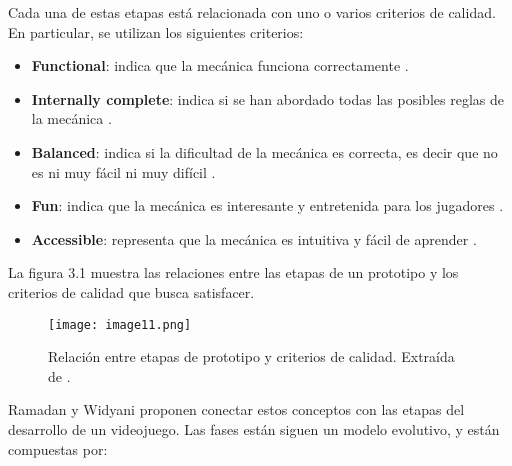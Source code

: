 \par Cada una de estas etapas está relacionada con uno o varios criterios de calidad. En particular, se utilizan los siguientes criterios:
\begin{itemize}
    \item \textbf{Functional}: indica que la mecánica funciona correctamente \cite{ramadanGameDevelopmentLife2013,fullertonGameDesignWorkshop2008}.
    \item \textbf{Internally complete}: indica si se han abordado todas las posibles reglas de la mecánica \cite{ramadanGameDevelopmentLife2013,fullertonGameDesignWorkshop2008}.
    \item \textbf{Balanced}: indica si la dificultad de la mecánica es correcta, es decir que no es ni muy fácil ni muy difícil \cite{ramadanGameDevelopmentLife2013,fullertonGameDesignWorkshop2008}.
    \item \textbf{Fun}: indica que la mecánica es interesante y entretenida para los jugadores \cite{ramadanGameDevelopmentLife2013,fullertonGameDesignWorkshop2008}.
    \item \textbf{Accessible}: representa que la mecánica es intuitiva y fácil de aprender \cite{ramadanGameDevelopmentLife2013,fullertonGameDesignWorkshop2008}.
\end{itemize}
\par La figura 3.1 muestra las relaciones entre las etapas de un prototipo y los criterios de calidad que busca satisfacer.
%
\begin{figure}[h]
  \centering
  \texttt{[image: image11.png]}
  \caption{Relación entre etapas de prototipo y criterios de calidad. Extraída de \cite{ramadanGameDevelopmentLife2013}.}
  \label{fig:x relacion entre prototipo y criterios de calidad}
\end{figure}
\par Ramadan y Widyani \cite{ramadanGameDevelopmentLife2013} proponen conectar estos conceptos con las etapas del desarrollo de un videojuego. Las fases están siguen un modelo evolutivo, y están compuestas por:

